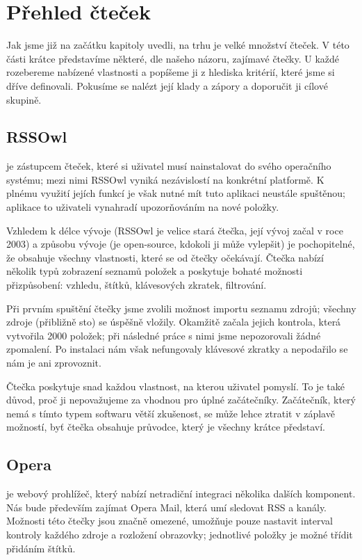 \section{Přehled čteček}

Jak jsme již na začátku kapitoly uvedli, na trhu je velké množství čteček.
V této části krátce představíme některé, dle našeho názoru, zajímavé čtečky.
U každé rozebereme nabízené vlastnosti a popíšeme ji z hlediska kritérií, které jsme si dříve definovali.
Pokusíme se nalézt její klady a zápory a doporučit ji cílové skupině.

\subsection{RSSOwl}

 je zástupcem čteček, které si uživatel musí nainstalovat do svého operačního systému; mezi nimi RSSOwl vyniká nezávislostí na konkrétní platformě.
K plnému využití jejích funkcí je však nutné mít tuto aplikaci neustále spuštěnou; aplikace to uživateli vynahradí upozorňováním na nové položky.

Vzhledem k délce vývoje (RSSOwl je velice stará čtečka, její vývoj začal v roce 2003) a způsobu vývoje (je open-source, kdokoli ji může vylepšit) je pochopitelné, že obsahuje všechny vlastnosti, které se od čtečky očekávají.
Čtečka nabízí několik typů zobrazení seznamů položek a poskytuje bohaté možnosti přizpůsobení: vzhledu, štítků, klávesových zkratek, filtrování.

Při prvním spuštění čtečky jsme zvolili možnost importu seznamu zdrojů; všechny zdroje (přibližně sto) se úspěšně vložily.
Okamžitě začala jejich kontrola, která vytvořila 2000 položek; při následné práce s nimi jsme nepozorovali žádné zpomalení.
Po instalaci nám však nefungovaly klávesové zkratky a nepodařilo se nám je ani zprovoznit.

Čtečka poskytuje snad každou vlastnost, na kterou uživatel pomyslí.
To je také důvod, proč ji nepovažujeme za vhodnou pro úplné začátečníky.
Začátečník, který nemá s tímto typem softwaru větší zkušenost, se může lehce ztratit v záplavě možností, byť čtečka obsahuje průvodce, který je všechny krátce představí.

\subsection{Opera}

 je webový prohlížeč, který nabízí netradiční integraci několika dalších komponent.
Nás bude především zajímat Opera Mail, která umí sledovat RSS a  kanály.
Možnosti této čtečky jsou značně omezené, umožňuje pouze nastavit interval kontroly každého zdroje a rozložení obrazovky; jednotlivé položky je možné třídit přidáním štítků.

